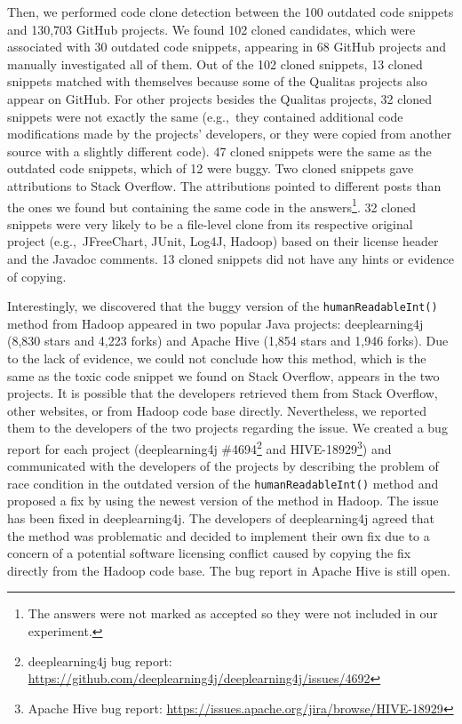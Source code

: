 \documentclass[10pt,journal,compsoc]{IEEEtran}
\begin{document}
Then, we performed code clone detection between the 100 outdated code snippets and 130,703 GitHub projects.
We found 102 cloned candidates, which were associated with 30 outdated code snippets, 
appearing in 68 GitHub projects and manually investigated all
of them. Out of the 102 cloned snippets,
13 cloned snippets matched with themselves because some of the Qualitas
projects also appear on GitHub. For other projects besides the Qualitas
projects, 32 cloned snippets were not exactly the same
(e.g.,~they contained additional code modifications made by the projects'
developers, or they were copied from another source with a slightly different code).
47 cloned snippets were the same as the
outdated code snippets, which of 12 were buggy.
Two cloned snippets gave attributions to Stack Overflow. The attributions
pointed to different posts than the ones we found but containing the same code
in the answers\footnote{The answers were not marked as accepted so they were not 
included in our experiment.}. 32 cloned snippets were very likely to be a file-level
clone from its respective original project (e.g.,~JFreeChart, JUnit, Log4J,
Hadoop) based on their license header and the Javadoc comments. 
13 cloned snippets did not have any hints or evidence of copying.

Interestingly, we discovered that the buggy version of the
\texttt{humanReadableInt()} method from Hadoop appeared in two popular Java
projects: deeplearning4j (8,830 stars and 4,223 forks) and Apache Hive (1,854
stars and 1,946 forks). Due to the lack of evidence, we could not conclude how
this method, which is the same as the toxic code snippet we found on
Stack Overflow, appears in the two projects. It is possible that the developers
retrieved them from Stack Overflow, other websites, or from Hadoop code base
directly. Nevertheless, we reported them to the developers of the two projects
regarding the issue. We created a bug report for each project (deeplearning4j
\#4694\footnote{deeplearning4j bug report:
	\url{https://github.com/deeplearning4j/deeplearning4j/issues/4692}} and
HIVE-18929\footnote{Apache Hive bug report: \url{
		https://issues.apache.org/jira/browse/HIVE-18929}}) and communicated with the
developers of the projects by describing the problem of race condition in the
outdated version of the \texttt{humanReadableInt()} method and proposed a fix by
using the newest version of the method in Hadoop. The issue has been fixed in
deeplearning4j. The developers of deeplearning4j agreed that the method was
problematic and decided to implement their own fix due to a concern of a
potential software licensing conflict caused by copying the fix directly from
the Hadoop code base. The bug report in Apache Hive is still open.
\end{document}
